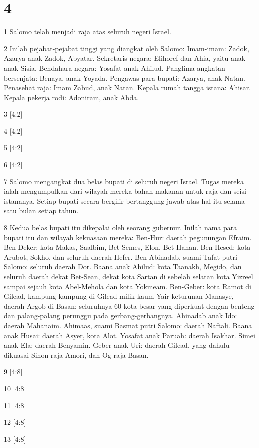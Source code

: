 \chapter{4}

\par 1 Salomo telah menjadi raja atas seluruh negeri Israel.
\par 2 Inilah pejabat-pejabat tinggi yang diangkat oleh Salomo: Imam-imam: Zadok, Azarya anak Zadok, Abyatar. Sekretaris negara: Elihoref dan Ahia, yaitu anak-anak Sisia. Bendahara negara: Yosafat anak Ahilud. Panglima angkatan bersenjata: Benaya, anak Yoyada. Pengawas para bupati: Azarya, anak Natan. Penasehat raja: Imam Zabud, anak Natan. Kepala rumah tangga istana: Ahisar. Kepala pekerja rodi: Adoniram, anak Abda.
\par 3 [4:2]
\par 4 [4:2]
\par 5 [4:2]
\par 6 [4:2]
\par 7 Salomo mengangkat dua belas bupati di seluruh negeri Israel. Tugas mereka ialah mengumpulkan dari wilayah mereka bahan makanan untuk raja dan seisi istananya. Setiap bupati secara bergilir bertanggung jawab atas hal itu selama satu bulan setiap tahun.
\par 8 Kedua belas bupati itu dikepalai oleh seorang gubernur. Inilah nama para bupati itu dan wilayah kekuasaan mereka: Ben-Hur: daerah pegunungan Efraim. Ben-Deker: kota Makas, Saalbim, Bet-Semes, Elon, Bet-Hanan. Ben-Hesed: kota Arubot, Sokho, dan seluruh daerah Hefer. Ben-Abinadab, suami Tafat putri Salomo: seluruh daerah Dor. Baana anak Ahilud: kota Taanakh, Megido, dan seluruh daerah dekat Bet-Sean, dekat kota Sartan di sebelah selatan kota Yizreel sampai sejauh kota Abel-Mehola dan kota Yokmeam. Ben-Geber: kota Ramot di Gilead, kampung-kampung di Gilead milik kaum Yair keturunan Manasye, daerah Argob di Basan; seluruhnya 60 kota besar yang diperkuat dengan benteng dan palang-palang perunggu pada gerbang-gerbangnya. Ahinadab anak Ido: daerah Mahanaim. Ahimaas, suami Basmat putri Salomo: daerah Naftali. Baana anak Husai: daerah Asyer, kota Alot. Yosafat anak Paruah: daerah Isakhar. Simei anak Ela: daerah Benyamin. Geber anak Uri: daerah Gilead, yang dahulu dikuasai Sihon raja Amori, dan Og raja Basan.
\par 9 [4:8]
\par 10 [4:8]
\par 11 [4:8]
\par 12 [4:8]
\par 13 [4:8]
